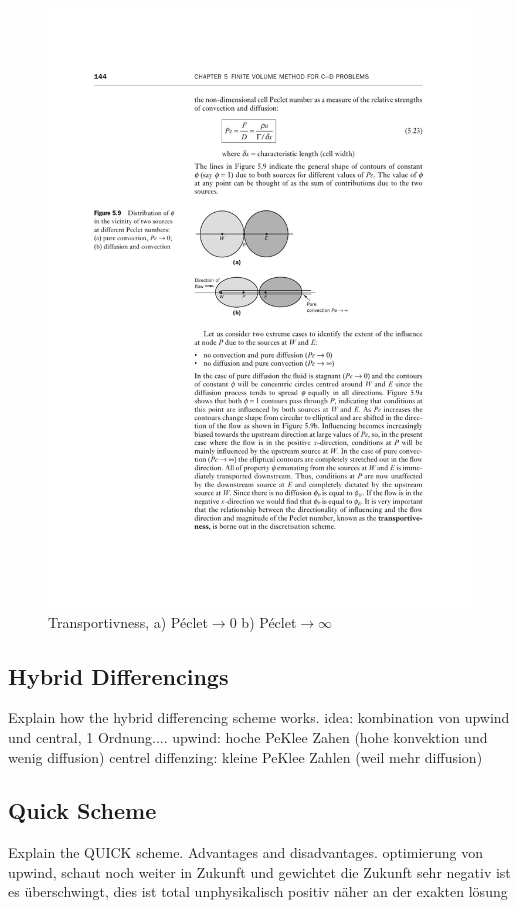 \documentclass[a4paper]{scrartcl}
\begin{document}
\begin{figure}[h!]
\begin{center}
\includegraphics[scale=1.0]{images/55.pdf}
\caption{Transportivness, a) Péclet$\to$0 b) Péclet$\to \infty$}
\label{fig:55}
\end{center}
\end{figure}


\subsection{Hybrid Differencings} Explain how the hybrid differencing scheme
works.
idea: kombination von upwind und central, 1 Ordnung....
upwind: hoche PeKlee Zahen (hohe konvektion und wenig diffusion)
centrel diffenzing: kleine PeKlee Zahlen (weil mehr diffusion)

\subsection{Quick Scheme} Explain the QUICK scheme. Advantages and
disadvantages.
optimierung von upwind, schaut noch weiter in Zukunft und gewichtet die Zukunft
sehr negativ ist es überschwingt, dies ist total unphysikalisch
positiv näher an der exakten lösung
\end{document}
